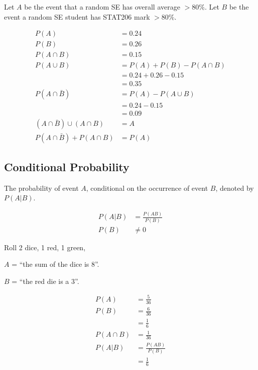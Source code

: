                     Let $A$ be the event that a random SE has overall average $>80\%$.
                    Let $B$ be the event a random SE student has STAT206 mark $>80\%$.

                    \begin{align*}
                        P(A) &= 0.24 \\
                        P(B) &= 0.26 \\
                        P(A \cap B) &= 0.15 \\
                        P(A \cup B) &= P(A) + P(B) - P(A \cap B) \\
                        &= 0.24 + 0.26 - 0.15 \\
                        &= 0.35 \\
                        P (A \cap \bar{B}) &= P (A) - P(A\cup B) \\
                        &= 0.24 - 0.15 \\
                        &= 0.09 \\
                        (A \cap \bar{B}) \cup (A \cap B) &= A \\
                        P(A \cap \bar{B}) + P(A \cap B) &= P(A)
                    \end{align*}
                \subsection{Conditional Probability} %
                \label{sub:conditional_probability}
                    The probability of event $A$, conditional on the occurrence of event $B$, denoted by $P(A|B)$.

                    \begin{align*}
                        P(A|B) &= \frac{P(AB)}{P(B)} \\
                        P(B) &\not= 0
                    \end{align*}

                    \ex
                    Roll 2 dice, 1 red, 1 green,

                    $A$ = ``the sum of the dice is 8''.

                    $B$ = ``the red die is a 3''.

                    \begin{align*}
                        P(A) &= \frac{5}{36} \\
                        P(B) &= \frac{6}{36} \\
                             &= \frac{1}{6} \\
                        P(A \cap B) &= \frac{1}{36} \\
                        P(A|B) &= \frac{P(AB)}{P(B)} \\
                               &= \frac{1}{6}
                    \end{align*}
